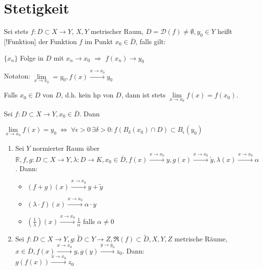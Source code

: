 \section{Stetigkeit}
\begin{definition}
	Sei stets $f:D\subset X\rightarrow Y$, $X,Y$ metrischer Raum, $D=\mathcal{D}(f)\neq \emptyset, y_0\in Y$ heißt [!Funktion] der Funktion $f$ im Punkt $x_0\in \overline{D}$, falls gilt:
	\begin{center}
		$\{x_n\}$ Folge in $D$ mit $x_n\to x_0$ $\Rightarrow$ $f(x_n)\to y_0$
	\end{center}
	Notaton: $\lim\limits_{x\rightarrow x_0} = y_0, f(x)\overset{x\to x_0}{\longrightarrow } y_0$
\end{definition}
\begin{remark}
	Falls $x_0\in D$  von $D$, d.h. kein \gls{hp} von $D$, dann ist stets $\lim\limits_{x\rightarrow x_0} f(x) = f(x_0)$.
\end{remark}

\begin{proposition}
	Sei $f:D\subset X\to Y, x_0\in\overline{D}$. Dann
	\begin{center}
	$\lim\limits_{x\rightarrow x_0} f(x) = y_0 \;\Leftrightarrow \; \forall\epsilon > 0\,\exists \delta > 0: f(B_\delta(x_0)\cap D)\subset B_\epsilon(y_0)$
	\end{center}
\end{proposition}

\begin{proposition}[Rechenregeln] \label{proposition:rechenregel_stetigkeit}
	\begin{enumerate}[label={\arabic*)}]
		\item Sei $Y$ normierter Raum über $\mathbb{R}, f,g:D\subset X\to Y,\lambda: D\to K, x_0\in\overline{D}, f(x)\overset{x\to x_0}{\longrightarrow} y, g(x) \overset{x\to x_0}{\longrightarrow} \tilde{y}, \lambda(x)\overset{x\to x_0}{\longrightarrow} \alpha$. Dann:
		\begin{itemize}
			\item $(f+g)(x) \overset{x\to x_0}{\longrightarrow} y+\tilde{y}$
			\item $(\lambda \cdot f)(x) \overset{x\to x_0}{\longrightarrow} \alpha\cdot y$
			\item $\left(\frac{1}{\lambda}\right)(x) \overset{x\to x_0}{\longrightarrow} \frac{1}{\alpha}$ falls $\alpha\neq 0$
		\end{itemize}
		\item Sei $f: D\subset X\to Y, g:\tilde{D}\subset Y\to Z, \Re(f)\subset\tilde{D}, X,Y,Z$ metrische Räume, $x\in\overline{D}, f(x)\overset{x\to x_0}{\longrightarrow}y, g(y)\overset{y\to y_0}{\longrightarrow} z_0$. Dann:\\
		$g(f(x)) \overset{x\to x_0}{\longrightarrow} z_0$
	\end{enumerate}
\end{proposition}

